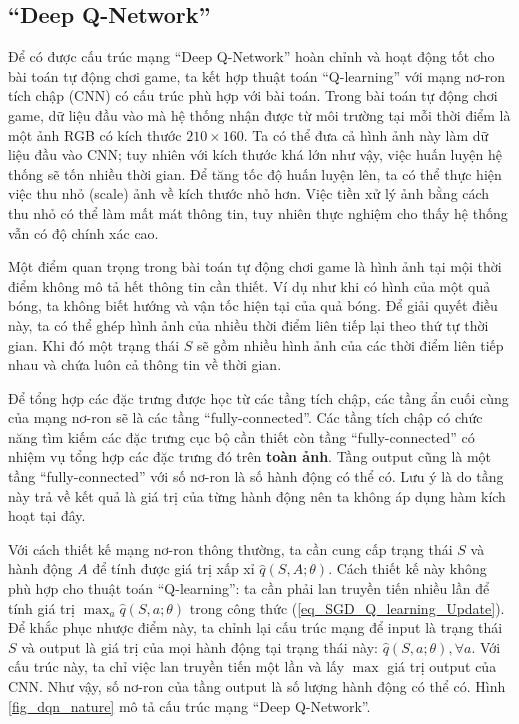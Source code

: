 \subsection{``Deep Q-Network''}
	Để có được cấu trúc mạng ``Deep Q-Network'' \cite{mnihdqn2015} hoàn chỉnh và hoạt động tốt cho bài toán tự động chơi game, ta kết hợp thuật toán ``Q-learning'' với mạng nơ-ron tích chập (CNN) có cấu trúc phù hợp với bài toán.
	Trong bài toán tự động chơi game, dữ liệu đầu vào mà hệ thống nhận được từ môi trường tại mỗi thời điểm là một ảnh RGB có kích thước $210\times160$.
	Ta có thể đưa cả hình ảnh này làm dữ liệu đầu vào CNN; tuy nhiên với kích thước khá lớn như vậy, việc huấn luyện hệ thống sẽ tốn nhiều thời gian.
	Để tăng tốc độ huấn luyện lên, ta có thể thực hiện việc thu nhỏ (scale) ảnh về kích thước nhỏ hơn.
	Việc tiền xử lý ảnh bằng cách thu nhỏ có thể làm mất mát thông tin, tuy nhiên thực nghiệm cho thấy hệ thống vẫn có độ chính xác cao.
	
	Một điểm quan trọng trong bài toán tự động chơi game là hình ảnh tại mội thời điểm không mô tả hết thông tin cần thiết.
	Ví dụ như khi có hình của một quả bóng, ta không biết hướng và vận tốc hiện tại của quả bóng.
	Để giải quyết điều này, ta có thể ghép hình ảnh của nhiều thời điểm liên tiếp lại theo thứ tự thời gian.
	Khi đó một trạng thái $S$ sẽ gồm nhiều hình ảnh của các thời điểm liên tiếp nhau và chứa luôn cả thông tin về thời gian.
	
	Để tổng hợp các đặc trưng được học từ các tầng tích chập, các tầng ẩn cuối cùng của mạng nơ-ron sẽ là các tầng ``fully-connected''.
	Các tầng tích chập có chức năng tìm kiếm các đặc trưng cục bộ cần thiết còn tầng ``fully-connected'' có nhiệm vụ tổng hợp các đặc trưng đó trên \textbf{toàn ảnh}.
	Tầng output cũng là một tầng ``fully-connected'' với số nơ-ron là số hành động có thể có.
	Lưu ý là do tầng này trả về kết quả là giá trị của từng hành động nên ta không áp dụng hàm kích hoạt tại đây.
	
	Với cách thiết kế mạng nơ-ron thông thường, ta cần cung cấp trạng thái $S$ và hành động $A$ để tính được giá trị xấp xỉ $\hat{q}(S, A;\theta)$.
	Cách thiết kế này không phù hợp cho thuật toán ``Q-learning'': ta cần phải lan truyền tiến nhiều lần để tính giá trị $\max_{a}\hat{q}(S, a;\theta)$ trong công thức (\ref{eq_SGD_Q_learning_Update}).
	Để khắc phục nhược điểm này, ta chỉnh lại cấu trúc mạng để input là trạng thái $S$ và output là giá trị của mọi hành động tại trạng thái này: $\hat{q}(S, a;\theta), \forall a$.
	Với cấu trúc này, ta chỉ việc lan truyền tiến một lần và lấy $\max$ giá trị output của CNN.
	Như vậy, số nơ-ron của tầng output là số lượng hành động có thể có.
	Hình \ref{fig_dqn_nature} mô tả cấu trúc mạng ``Deep Q-Network''.
	
